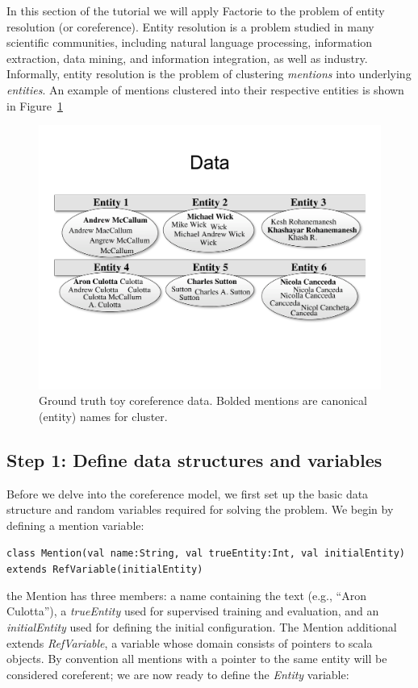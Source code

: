 \documentclass[]{manual}
\begin{document}
In this section of the tutorial we will apply Factorie to the problem
of entity resolution (or coreference). Entity resolution is a problem
studied in many scientific communities, including natural language
processing, information extraction, data mining, and information
integration, as well as industry. Informally, entity resolution is the
problem of clustering {\em mentions} into underlying {\em
  entities}. An example of mentions clustered into their respective
entities is shown in Figure~\ref{fig:tutorial-coref-toy-data}


\begin{figure}[h]
\begin{center}
\includegraphics[width=0.88 \textwidth]{figs/coref-toy-data}
\caption{Ground truth toy coreference data. Bolded mentions are canonical (entity) names for cluster.}
\label{fig:tutorial-coref-toy-data}
\end{center}
\end{figure}


\subsection{Step 1: Define data structures and variables}
Before we delve into the coreference model, we first set up the basic
data structure and random variables required for solving the
problem. We begin by defining a mention variable:

\lstinline!class Mention(val name:String, val trueEntity:Int, val initialEntity) extends RefVariable(initialEntity)!

\noindent the Mention has three members: a name containing the text
(e.g., ``Aron Culotta''), a {\em trueEntity} used for supervised
training and evaluation, and an {\em initialEntity} used for defining
the initial configuration. The Mention additional extends {\em
  RefVariable}, a variable whose domain consists of pointers to scala
objects. By convention all mentions with a pointer to the same entity
will be considered coreferent; we are now ready to define the {\em
  Entity} variable:
\end{document}
